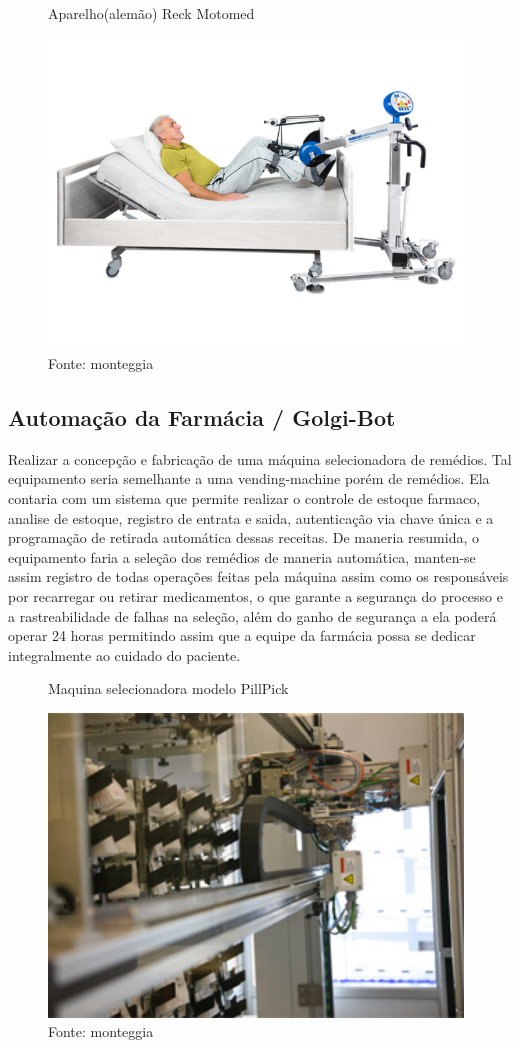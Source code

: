 \documentclass[../poliXuniversity_hospital_(USP)_report.tex]{subfiles}
\begin{document}
\begin{figure}[h!]
\centering
    \caption{Aparelho(alemão) Reck Motomed\cite{reck}}
    \centering %
    \includegraphics[width=11cm]{images/motomed.jpg}
    \caption*{Fonte: monteggia}
    \label{fig: Reck MOTOmed}
\end{figure}

\subsection{Automação da Farmácia / Golgi-Bot}

Realizar a concepção e fabricação de uma máquina selecionadora de remédios. Tal equipamento seria semelhante a uma vending-machine porém de remédios. Ela contaria com um sistema que permite realizar o controle de estoque farmaco, analise de estoque, registro de entrata e saida, autenticação via chave única e a programação de retirada automática dessas receitas. De maneria resumida, o equipamento faria a seleção dos remédios de maneria automática, manten-se assim registro de todas operações feitas pela máquina assim como os responsáveis por recarregar ou retirar medicamentos, o que garante a segurança do processo e a rastreabilidade de falhas na seleção, além do ganho de segurança a ela poderá operar 24 horas permitindo assim que a equipe da farmácia possa se dedicar integralmente ao cuidado do paciente.

\begin{figure}[ht]
\centering
    \caption{Maquina selecionadora modelo PillPick \cite{PillPick}}
    \centering %
    \includegraphics[width=11cm]{images/pillpick.jpg}
    \caption*{Fonte: monteggia}
    \label{fig: Pill Pick Swisslog}
\end{figure}
\end{document}

